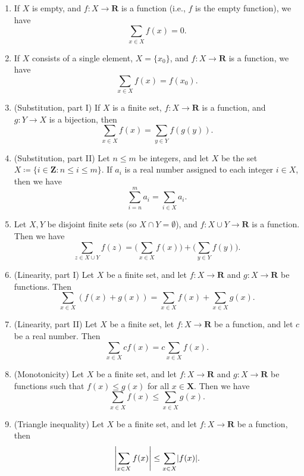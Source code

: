 \begin{proposition}\label{7.1.11}
    \mbox{}
    \begin{enumerate}
        \item If \(X\) is empty, and \(f : X \to \mathbf{R}\) is a function (i.e., \(f\) is the empty function), we have
              \[
                  \sum_{x \in X} f(x) = 0.
              \]
        \item If \(X\) consists of a single element, \(X = \{x_0\}\), and \(f : X \to \mathbf{R}\) is a function, we have
              \[
                  \sum_{x \in X} f(x) = f(x_0).
              \]
        \item (Substitution, part I) If \(X\) is a finite set, \(f : X \to \mathbf{R}\) is a function, and \(g : Y \to X\) is a bijection, then
              \[
                  \sum_{x \in X} f(x) = \sum_{y \in Y} f(g(y)).
              \]
        \item (Substitution, part II) Let \(n \leq m\) be integers, and let \(X\) be the set \(X \coloneqq \{i \in \mathbf{Z} : n \leq i \leq m\}\).
              If \(a_i\) is a real number assigned to each integer \(i \in X\), then we have
              \[
                  \sum_{i = n}^m a_i = \sum_{i \in X} a_i.
              \]
        \item Let \(X, Y\) be disjoint finite sets (so \(X \cap Y = \emptyset\)), and \(f : X \cup Y \to \mathbf{R}\) is a function.
              Then we have
              \[
                  \sum_{z \in X \cup Y} f(z) = \Bigg(\sum_{x \in X} f(x)\Bigg) + \Bigg(\sum_{y \in Y} f(y)\Bigg).
              \]
        \item (Linearity, part I) Let \(X\) be a finite set, and let \(f : X \to \mathbf{R}\) and \(g : X \to \mathbf{R}\) be functions.
              Then
              \[
                  \sum_{x \in X} (f(x) + g(x)) = \sum_{x \in X} f(x) + \sum_{x \in X} g(x).
              \]
        \item (Linearity, part II) Let \(X\) be a finite set, let \(f : X \to \mathbf{R}\) be a function, and let \(c\) be a real number.
              Then
              \[
                  \sum_{x \in X} cf(x) = c \sum_{x \in X} f(x).
              \]
        \item (Monotonicity) Let \(X\) be a finite set, and let \(f : X \to \mathbf{R}\) and \(g : X \to \mathbf{R}\) be functions such that \(f(x) \leq g(x)\) for all \(x \in \mathbf{X}\).
              Then we have
              \[
                  \sum_{x \in X} f(x) \leq \sum_{x \in X} g(x).
              \]
        \item (Triangle inequality) Let \(X\) be a finite set, and let \(f : X \to \mathbf{R}\) be a function, then
              \[
                  \abs*{\sum_{x \in X} f(x)} \leq \sum_{x \in X} \abs*{f(x)}.
              \]
    \end{enumerate}
\end{proposition}

